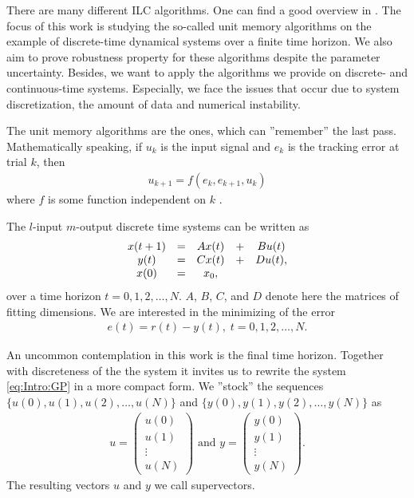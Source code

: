 There are many different ILC algorithms. One can find a good overview in \cite{Bristov06}.
The focus of this work is studying the so-called unit memory algorithms on the example of discrete-time dynamical systems over a finite time horizon. We also aim to prove robustness property for these algorithms despite the parameter uncertainty. Besides, we want to apply the algorithms we provide on discrete- and continuous-time systems. Especially, we face the issues that occur due to system discretization, the amount of data and numerical instability. 


The unit memory algorithms are the ones, which can ''remember'' the last pass. Mathematically speaking, if $u_k$ is the input signal and $e_k$ is the tracking error at trial $k$, then
\begin{align}
u_{k+1} = f(e_k, e_{k+1}, u_k)
\end{align}
where $f$ is some function independent on $k$ \cite{ILC}. 

The $l$-input $m$-output discrete time systems can be written as 
\begin{align}
\label{eq:Intro:GP}
\begin{split}
&\begin{array}{c c c c c}
x(t+1) &= &A x(t)& + &B u(t)  \\
y ( t) &= &C x(t)&  + &D u(t),\\ 
x(0)& = &x_0, & &
\end{array}\\
\end{split}
\end{align}
over a time horizon $t = 0, 1, 2, \dots, N$. $A$, $B$, $C$, and $D$ denote here the matrices of fitting dimensions.
We are interested in the minimizing of the error 
\begin{align}
\label{eq:Intro:error}
e(t) = r(t) - y(t), \; t  = 0, 1, 2, \dots, N. 
\end{align}

An uncommon contemplation in this work is the final time horizon. 
Together with discreteness of the the system it invites us to rewrite the system \eqref{eq:Intro:GP} in a more compact form. We ''stock'' the sequences $\{u(0), u(1), u(2), \dots, u(N)\}$ and $\{y(0), y(1), y(2), \dots, y(N)\}$ as 
\begin{align*}
u = \begin{pmatrix}
u(0) \\ u(1) \\ \vdots \\ u(N)
\end{pmatrix} \text{ and }
y = \begin{pmatrix}
y(0) \\ y(1) \\ \vdots \\ y(N)
\end{pmatrix}. 
\end{align*}
The resulting vectors $u$ and $y$ we call supervectors. 

